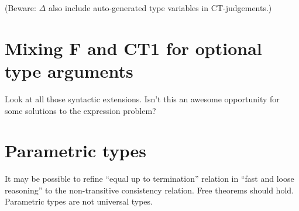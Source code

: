 \documentclass{amsart}
\begin{document}

(Beware: $\Delta$ also include auto-generated type variables in
CT-judgements.)



\section{Mixing F and CT1 for optional type arguments}

Look at all those syntactic extensions. Isn't this an awesome
opportunity for some solutions to the expression problem?


\section{Parametric types}

It may be possible to refine ``equal up to termination'' relation
in ``fast and loose reasoning'' to the non-transitive consistency
relation. Free theorems should hold. Parametric types are not
universal types.



\end{document}
